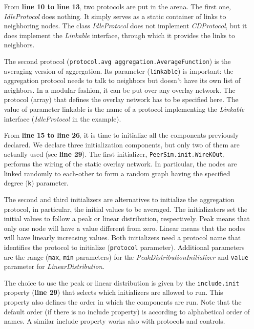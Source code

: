 \documentclass[a4paper,11pt]{article}
\begin{document}
From \textbf{line 10 to line 13}, two protocols are put in the arena.
The first one, \emph{IdleProtocol} does nothing.
It simply serves as a static container of links to neighboring nodes.
The class \emph{IdleProtocol} does not implement \emph{CDProtocol}, but it
does implement the \emph{Linkable} interface, through which it provides
the links to neighbors.

The second protocol (\texttt{protocol.avg aggregation.AverageFunction})
is the averaging version of aggregation. Its parameter (\texttt{linkable})
is important: the aggregation protocol needs to talk to neighbors
but doesn't have its own list of neighbors.
In a modular fashion, it can be put over any overlay network.
The protocol (array) that defines the overlay network has to be specified
here.
The value of parameter linkable is the name
of a protocol implementing  the \emph{Linkable} interface
(\emph{IdleProtocol}
in the example).

From \textbf{line 15 to line 26}, it is time to initialize all the
components previously declared. We declare three initialization components,
but only two of them are actually used (see \textbf{line 29}).
The first initializer, \texttt{PeerSim.init.WireKOut},
performs the wiring of the static overlay network. 
In particular, the nodes are linked
randomly to each-other to form a random graph having the specified
degree (\texttt{k}) parameter. 

The second and third initializers are alternatives to initialize the aggregation
protocol, in particular, the initial values to be averaged.
The initializaters set the initial values to follow a peak or linear
distribution, respectively.
Peak means that only one node will have a value different from zero.
Linear means that the nodes will have linearly increasing values.
Both initializers need a protocol name that identifies the
protocol to initialize (\texttt{protocol} parameter).
Additional parameters are the range (\texttt{max}, \texttt{min}
parameters)
for the \emph{PeakDistributionInitializer} and \texttt{value}
parameter for \emph{LinearDistribution}. 

The choice to use the peak or linear distribution is given by the
\texttt{include.init} property (\textbf{line 29}) that selects which
initializers are 
allowed to run.
This property also defines the order in which the components are run.
Note that the default order (if there is no include property) is according
to alphabetical order of names.
A similar include property works also with protocols and controls.
\end{document}
